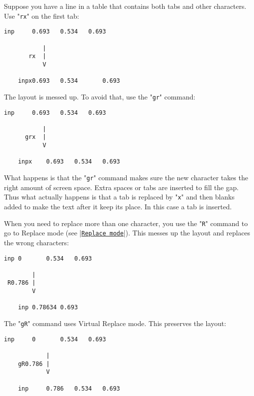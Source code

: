 Suppose you have a line in a table that contains both tabs and other characters.
Use "\verb!rx!" on the first tab:

\begin{Verbatim}[samepage=true]
    inp     0.693   0.534   0.693 

           |
       rx  |
           V

    inpx0.693   0.534       0.693 
\end{Verbatim}

The layout is messed up.
To avoid that, use the "\verb!gr!" command:

\begin{Verbatim}[samepage=true]
    inp     0.693   0.534   0.693 

           |
      grx  |
           V

    inpx    0.693   0.534   0.693 
\end{Verbatim}

What happens is that the "\verb!gr!" command makes sure the new character takes the right amount of screen space.
Extra spaces or tabs are inserted to fill the gap.
Thus what actually happens is that a tab is replaced by "\verb!x!" and then blanks added to make the text after it keep its place.
In this case a tab is inserted.

When you need to replace more than one character, you use the "\verb!R!" command to go to Replace mode (see |\hyperref[Replace mode]{\texttt{Replace mode}}|).
This messes up the layout and replaces the wrong characters:

\begin{Verbatim}[samepage=true]
    inp 0       0.534   0.693 

        |
 R0.786 |
        V

    inp 0.78634 0.693 
\end{Verbatim}

The "\verb!gR!" command uses Virtual Replace mode.
This preserves the layout:

\begin{Verbatim}[samepage=true]
    inp     0       0.534   0.693 

            |
    gR0.786 |
            V

    inp     0.786   0.534   0.693 
\end{Verbatim}

\clearpage
